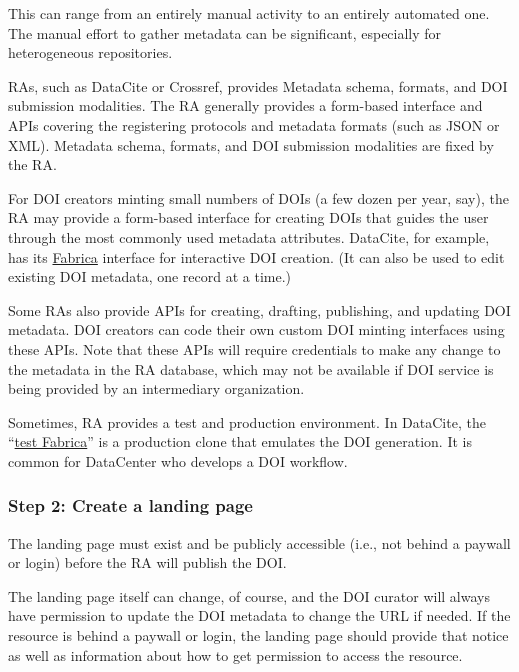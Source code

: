 \documentclass[11pt,a4paper]{ivoa}
\begin{document}
This can range from an entirely manual activity to an entirely automated one. The manual effort to gather metadata can be significant, especially for heterogeneous repositories.

RAs, such as DataCite or Crossref, provides Metadata schema, formats, and DOI submission modalities. The RA generally provides a form-based interface and APIs covering the registering protocols and metadata formats (such as JSON or XML). Metadata schema, formats, and DOI submission modalities are fixed by the RA.%

For DOI creators minting small numbers of DOIs (a few dozen per year, say), the RA may provide a form-based interface for creating DOIs that guides the user through the most commonly used metadata attributes. \mbox{DataCite}, for example, has its \href{https://doi.datacite.org/}{Fabrica} interface for interactive DOI creation. (It can also be used to edit existing DOI metadata, one record at a time.)

Some RAs also provide APIs for creating, drafting,  publishing, and updating DOI metadata. DOI creators can code their own custom DOI minting interfaces using these APIs. Note that these APIs will require credentials to make any change to the metadata in the RA database, which may not be available if DOI service is being provided by an intermediary organization.

Sometimes, RA provides a test and production environment. In \mbox{DataCite}, the ``\href{https://doi.test.datacite.org/}{test Fabrica}'' is a production clone that emulates the DOI generation. It is common for DataCenter who develops a DOI workflow.

\subsubsection{Step 2: Create a landing page}\hypertarget{step-2-create-a-landing-page}{}\label{sec:step-2-create-a-landing-page}

The landing page must exist and be publicly accessible (i.e., not behind a paywall or login) before the RA will publish the DOI.

The landing page itself can change, of course, and the DOI curator will always have permission to update the DOI metadata to change the URL if needed. If the resource is behind a paywall or login, the landing page should provide that notice as well as information about how to get permission to access the resource.
\end{document}

